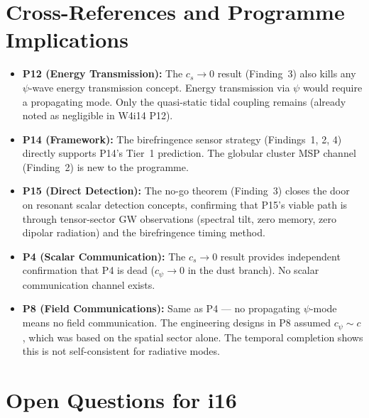 \documentclass[11pt]{article}
\theoremstyle{definition}
\theoremstyle{remark}
\begin{document}
\section*{Cross-References and Programme Implications}

\begin{itemize}[nosep]
\item \textbf{P12 (Energy Transmission):} The $c_s \to 0$ result
  (Finding~3) also kills any $\psi$-wave energy transmission concept.
  Energy transmission via $\psi$ would require a propagating mode.
  Only the quasi-static tidal coupling remains (already noted as
  negligible in W4i14 P12).

\item \textbf{P14 (Framework):} The birefringence sensor strategy
  (Findings~1, 2, 4) directly supports P14's Tier~1 prediction. The
  globular cluster MSP channel (Finding~2) is new to the programme.

\item \textbf{P15 (Direct Detection):} The no-go theorem (Finding~3)
  closes the door on resonant scalar detection concepts, confirming
  that P15's viable path is through tensor-sector GW observations
  (spectral tilt, zero memory, zero dipolar radiation) and the
  birefringence timing method.

\item \textbf{P4 (Scalar Communication):} The $c_s \to 0$ result
  provides independent confirmation that P4 is dead ($c_\psi \to 0$
  in the dust branch). No scalar communication channel exists.

\item \textbf{P8 (Field Communications):} Same as P4 --- no
  propagating $\psi$-mode means no field communication. The
  engineering designs in P8 assumed $c_\psi \sim c$, which was
  based on the spatial sector alone. The temporal completion
  shows this is not self-consistent for radiative modes.
\end{itemize}


\section*{Open Questions for i16}
\end{document}
